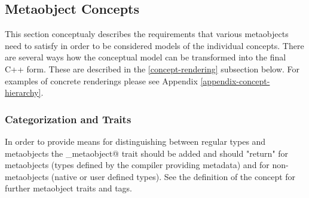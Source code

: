 \subsection{Metaobject Concepts}

This section conceptualy describes the requirements that various metaobjects
need to satisfy in order to be considered models of the individual
concepts. There are several ways how the conceptual model
can be transformed into the final C++ form. These are described in the \ref{concept-rendering} subsection below.
For examples of concrete renderings please see Appendix \ref{appendix-concept-hierarchy}.

\subsubsection{Categorization and Traits}

In order to provide means for distinguishing between regular types
and metaobjects the \verb@is_metaobject@ trait should be added
and should "return" \verb@true@ for metaobjects (types defined
by the compiler providing metadata) and \verb@false@
for non-metaobjects (native or user defined types).
See the definition of the {} concept for further 
metaobject traits and tags.




